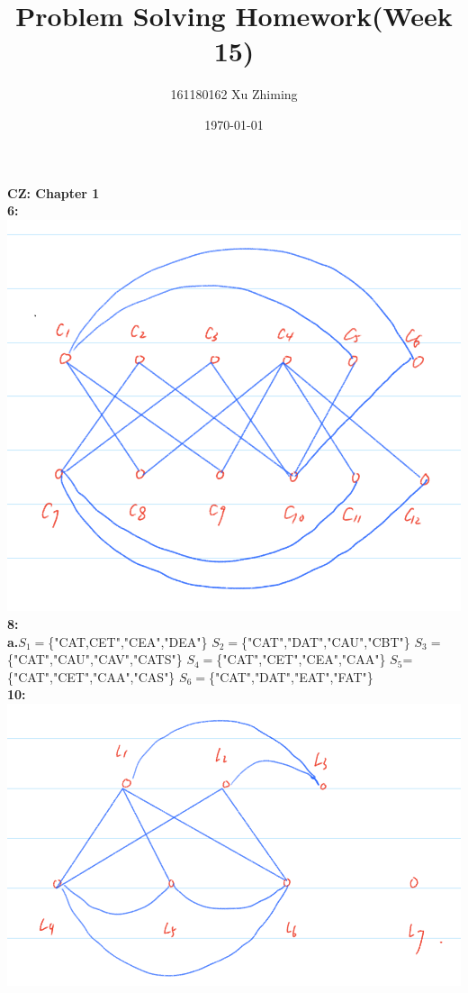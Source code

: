 \documentclass[11pt]{article}
\begin{document}
\title{Problem Solving Homework(Week 15)}\author{161180162 Xu Zhiming}\date{\today}\maketitle
\setlength\parindent{0em}
\large\textbf{CZ: Chapter 1}\\
\normalsize
\textbf{6:}\\
\includegraphics[scale=0.4]{1.png}\\
\textbf{8:}\\
\textbf{a.}$S_1=$\{"CAT,CET","CEA","DEA"\}    $S_2=$\{"CAT","DAT","CAU","CBT"\}    $S_3=$\{"CAT","CAU","CAV","CATS"\}
$S_4=$\{"CAT","CET","CEA","CAA"\}     $S_5$=\{"CAT","CET","CAA","CAS"\}    $S_6=$\{"CAT","DAT","EAT","FAT"\}\\
\textbf{10:}\\
\includegraphics[scale=0.4]{2.png}\\
\end{document}
